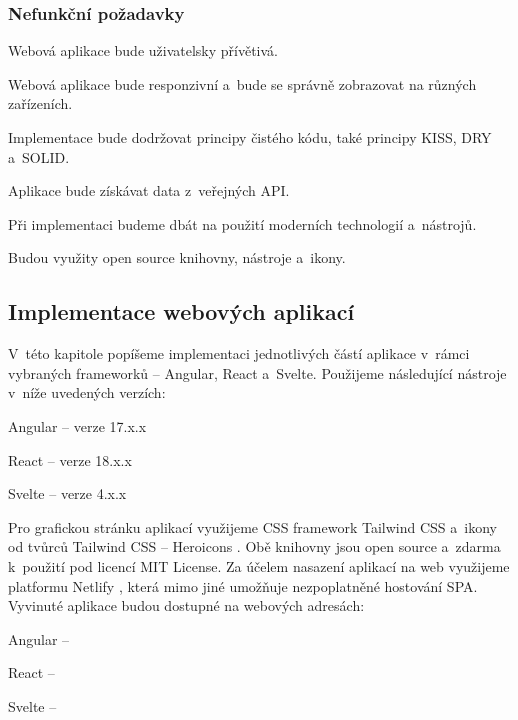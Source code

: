 \subsubsection{Nefunkční požadavky}

\begin{citemize}
	\item Webová aplikace bude uživatelsky přívětivá.
	\item Webová aplikace bude responzivní a~bude se správně zobrazovat na různých zařízeních.
	\item Implementace bude dodržovat principy čistého kódu, také principy KISS, DRY a~SOLID.
	\item Aplikace bude získávat data z~veřejných API.
	\item Při implementaci budeme dbát na použití moderních technologií a~nástrojů.
	\item Budou využity open source knihovny, nástroje a~ikony. 
\end{citemize}

\subsection{Implementace webových aplikací}

V~této kapitole popíšeme implementaci jednotlivých částí aplikace v~rámci vybraných frameworků -- Angular, React a~Svelte. Použijeme následující nástroje v~níže uvedených verzích:

\begin{citemize}
	\item Angular -- verze 17.x.x
	\item React -- verze 18.x.x
	\item Svelte -- verze 4.x.x
\end{citemize}

Pro grafickou stránku aplikací využijeme CSS framework Tailwind CSS \cite{tailwindcssframework} a~ikony od tvůrců Tailwind CSS -- Heroicons \cite{heroiconslib}. 
Obě knihovny jsou open source a~zdarma k~použití pod licencí MIT License. 
Za účelem nasazení aplikací na web využijeme platformu Netlify \cite{netlifyplatform}, která mimo jiné umožňuje nezpoplatněné hostování SPA. 
Vyvinuté aplikace budou dostupné na webových adresách:

\begin{citemize}
	\item Angular -- 
	\item React -- 
	\item Svelte -- 
\end{citemize}

